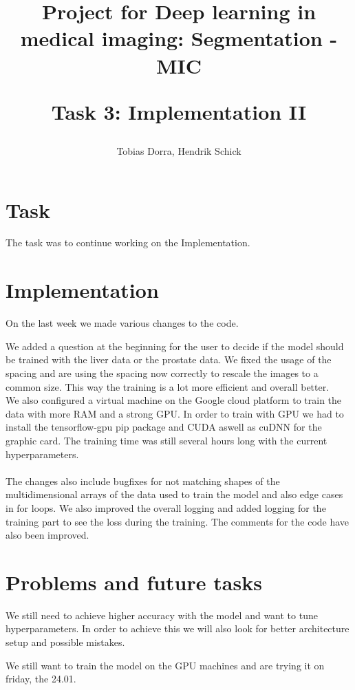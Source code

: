 \documentclass{article}
\author{Tobias Dorra, Hendrik Schick}
\title{Project for Deep learning in medical imaging: Segmentation - MIC \\ \begin{large} 
Task 3: Implementation II
\end{large}}
\begin{document}
	
	\maketitle

	\section{Task}

		The task was to continue working on the Implementation.

	\section{Implementation}
On the last week we made various changes to the code.

We added a question at the beginning for the user to decide if the model should be trained with the liver data or the prostate data. 
We fixed the usage of the spacing and are using the spacing now correctly to rescale the images to a common size. This way the training is a lot more efficient and overall better.
\\
\newline We also configured a virtual machine on the Google cloud platform to train  the data with more RAM and a strong GPU. In order to train with GPU we had to install the tensorflow-gpu pip package and CUDA aswell as cuDNN for the graphic card. The training time was still several hours long with the current hyperparameters.
\\\\
The changes also include bugfixes for not matching shapes of the multidimensional arrays of the data used to train the model and also edge cases in for loops.
We also improved the overall logging and added logging for the training part to see the loss during the training.
The comments for the code have also been improved.
	\section{Problems and future tasks}
We still need to achieve higher accuracy with the model and want to tune hyperparameters. In order to achieve this we will also look for better architecture setup and possible mistakes.

We still want to train the model on the GPU machines and are trying it on friday, the 24.01.
\end{document}
